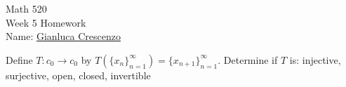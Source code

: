 \documentclass[10pt,oneside,openany]{memoir}
\begin{document}
\begin{center}
    {\large Math 520 \\[0.1in]Week 5 Homework}\\[.175in]
    {Name:} {\underline{Gianluca Crescenzo\hspace*{2in}}}\\[0.15in]
    \end{center}
    \vspace{4pt}
\begin{exercise}
Define $T:c_0 \rightarrow c_0$ by $T(\{x_n\}_{n = 1}^\infty) = \{x_{n+1}\}_{n = 1}^\infty$. Determine if $T$ is: injective, surjective, open, closed, invertible
\end{exercise}
\end{document}

